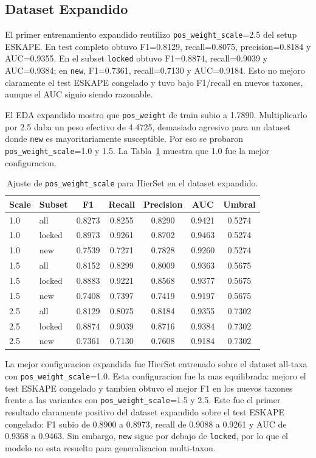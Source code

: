 \documentclass[journal,transmag]{../ieee_latex_template/IEEEtran}
\begin{document}
\subsection{Dataset Expandido}
El primer entrenamiento expandido reutilizo \texttt{pos\_weight\_scale}=2.5 del setup ESKAPE. En test completo obtuvo F1=0.8129, recall=0.8075, precision=0.8184 y AUC=0.9355. En el subset \texttt{locked} obtuvo F1=0.8874, recall=0.9039 y AUC=0.9384; en \texttt{new}, F1=0.7361, recall=0.7130 y AUC=0.9184. Esto no mejoro claramente el test ESKAPE congelado y tuvo bajo F1/recall en nuevos taxones, aunque el AUC siguio siendo razonable.

El EDA expandido mostro que \texttt{pos\_weight} de train subio a 1.7890. Multiplicarlo por 2.5 daba un peso efectivo de 4.4725, demasiado agresivo para un dataset donde \texttt{new} es mayoritariamente susceptible. Por eso se probaron \texttt{pos\_weight\_scale}=1.0 y 1.5. La Tabla~\ref{tab:expanded-results} muestra que 1.0 fue la mejor configuracion.

\begin{table}[!t]
\caption{Ajuste de \texttt{pos\_weight\_scale} para HierSet en el dataset expandido.}
\label{tab:expanded-results}
\centering
\small
\begin{tabular}{l l c c c c c}
\toprule
Scale & Subset & F1 & Recall & Precision & AUC & Umbral \\
\midrule
1.0 & all & 0.8273 & 0.8255 & 0.8290 & 0.9421 & 0.5274 \\
1.0 & locked & 0.8973 & 0.9261 & 0.8702 & 0.9463 & 0.5274 \\
1.0 & new & 0.7539 & 0.7271 & 0.7828 & 0.9260 & 0.5274 \\
1.5 & all & 0.8152 & 0.8299 & 0.8009 & 0.9363 & 0.5675 \\
1.5 & locked & 0.8883 & 0.9221 & 0.8568 & 0.9377 & 0.5675 \\
1.5 & new & 0.7408 & 0.7397 & 0.7419 & 0.9197 & 0.5675 \\
2.5 & all & 0.8129 & 0.8075 & 0.8184 & 0.9355 & 0.7302 \\
2.5 & locked & 0.8874 & 0.9039 & 0.8716 & 0.9384 & 0.7302 \\
2.5 & new & 0.7361 & 0.7130 & 0.7608 & 0.9184 & 0.7302 \\
\bottomrule
\end{tabular}
\end{table}

La mejor configuracion expandida fue HierSet entrenado sobre el dataset all-taxa con \texttt{pos\_weight\_scale}=1.0. Esta configuracion fue la mas equilibrada: mejoro el test ESKAPE congelado y tambien obtuvo el mejor F1 en los nuevos taxones frente a las variantes con \texttt{pos\_weight\_scale}=1.5 y 2.5. Este fue el primer resultado claramente positivo del dataset expandido sobre el test ESKAPE congelado: F1 subio de 0.8900 a 0.8973, recall de 0.9088 a 0.9261 y AUC de 0.9368 a 0.9463. Sin embargo, \texttt{new} sigue por debajo de \texttt{locked}, por lo que el modelo no esta resuelto para generalizacion multi-taxon.
\end{document}
